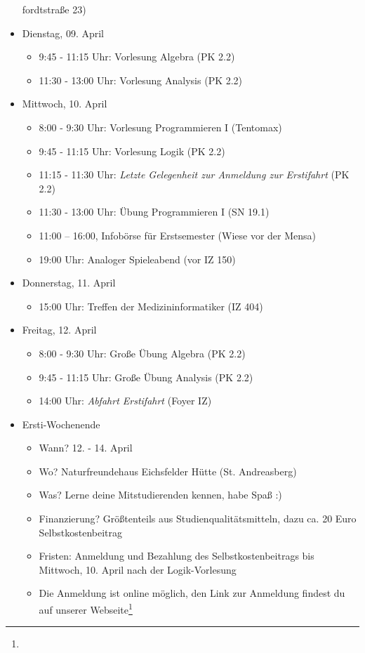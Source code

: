 \begin{itemize}
\begin{itemize}
        \end{itemize}fordtstraße 23)
    \item Dienstag, 09. April
	\begin{itemize}
	    \item 9:45 - 11:15 Uhr: Vorlesung Algebra (PK 2.2)
            \item 11:30 - 13:00 Uhr: Vorlesung Analysis (PK 2.2)
        \end{itemize}
    \item Mittwoch, 10. April
	    \begin{itemize}
	        \item 8:00 - 9:30 Uhr: Vorlesung Programmieren I (Tentomax)
    		\item 9:45 - 11:15 Uhr: Vorlesung Logik (PK 2.2)
    		\item 11:15 - 11:30 Uhr: \emph{Letzte Gelegenheit zur Anmeldung zur Erstifahrt} (PK 2.2)
            \item 11:30 - 13:00 Uhr: Übung Programmieren I (SN 19.1)
            \item 11:00 – 16:00, Infobörse für Erstsemester (Wiese vor der Mensa)
	    	\item 19:00 Uhr: Analoger Spieleabend (vor IZ 150)
	    \end{itemize}
    \item Donnerstag, 11. April
	    \begin{itemize}
		    \item 15:00 Uhr: Treffen der Medizininformatiker (IZ 404)
	    \end{itemize}
    \item Freitag, 12. April
	    \begin{itemize}
	         \item 8:00 - 9:30 Uhr: Große Übung Algebra (PK 2.2)
	         \item 9:45 - 11:15 Uhr: Große Übung Analysis (PK 2.2)
	         \item 14:00 Uhr: \emph{Abfahrt Erstifahrt} (Foyer IZ)
	    \end{itemize}
    \item Ersti-Wochenende
        \begin{itemize}
            \item Wann? 12. - 14. April
            \item Wo? Naturfreundehaus Eichsfelder Hütte (St. Andreasberg)
            \item Was? Lerne deine Mitstudierenden kennen, habe Spaß :)
            \item Finanzierung? Größtenteils aus Studienqualitätsmitteln, dazu ca. 20 Euro Selbstkostenbeitrag
            \item Fristen: Anmeldung und Bezahlung des Selbstkostenbeitrags bis Mittwoch, 10. April nach der Logik-Vorlesung
            \item Die Anmeldung ist online möglich, den Link zur Anmeldung findest du auf unserer Webseite\footnote{}
        \end{itemize}
\end{itemize}
